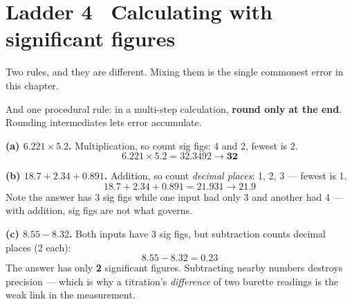 \documentclass{apchem-worksheet}
\begin{document}
\section*{\sffamily Ladder 4 \textbullet\ Calculating with significant
figures}

Two rules, and they are different. Mixing them is the single commonest
error in this chapter.

\begin{center}
\end{center}

And one procedural rule: in a multi-step calculation, \textbf{round only
at the end}. Rounding intermediates lets error accumulate.

\begin{workedexample}
\textbf{(a) $6.221 \times 5.2$.} Multiplication, so count sig figs:
4 and 2, fewest is 2.
\[ 6.221 \times 5.2 = 32.3492 \to \mathbf{32} \]

\textbf{(b) $18.7 + 2.34 + 0.891$.} Addition, so count \emph{decimal
places}: 1, 2, 3 --- fewest is 1.
\[ 18.7 + 2.34 + 0.891 = 21.931 \to \mathbf{21.9} \]
Note the answer has 3 sig figs while one input had only 3 and another had
4 --- with addition, sig figs are not what governs.

\textbf{(c) $8.55 - 8.32$.} Both inputs have 3 sig figs, but subtraction
counts decimal places (2 each):
\[ 8.55 - 8.32 = \mathbf{0.23} \]
The answer has only \textbf{2} significant figures. Subtracting nearby
numbers destroys precision --- which is why a titration's
\emph{difference} of two burette readings is the weak link in the
measurement.
\end{workedexample}
\end{document}
